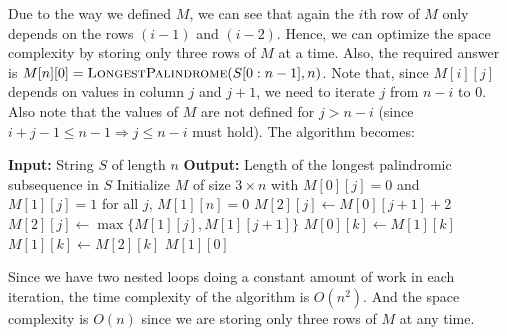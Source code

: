 \documentclass{article}
\begin{document}
  Due to the way we defined $M$, we can see that again the $i$th row of $M$ only depends on the rows $(i-1)$ and $(i-2)$.
  Hence, we can optimize the space complexity by storing only three rows of $M$ at a time.
  Also, the required answer is $M[n][0] = \textsc{LongestPalindrome}(S[0:n-1], n)$.
  Note that, since $M[i][j]$ depends on values in column $j$ and $j+1$, we need to iterate $j$ from $n-i$ to $0$.
  Also note that the values of $M$ are not defined for $j > n - i$ (since $i + j - 1 \le n - 1 \Rightarrow j \le n - i$ must hold).
  The algorithm becomes:
  \begin{algorithm}
    \caption{Longest Palindromic Subsequence}
    \begin{algorithmic}[1]
      \State \textbf{Input:} String $S$ of length $n$
      \State \textbf{Output:} Length of the longest palindromic subsequence in $S$
      \State Initialize $M$ of size $3 \times n$ with $M[0][j] = 0$ and $M[1][j] = 1$ for all $j$, $M[1][n] = 0$
            \State $M[2][j] \gets M[0][j+1] + 2$
          \Else
            \State $M[2][j] \gets \max\{M[1][j], M[1][j+1]\}$
          \EndIf
        \EndFor
        \State $M[0][k] \gets M[1][k]$
        \State $M[1][k] \gets M[2][k]$
        \EndFor
      \EndFor
      \State \Return $M[1][0]$
    \end{algorithmic}
  \end{algorithm}

  Since we have two nested loops doing a constant amount of work in each iteration, the time complexity of the algorithm is $O(n^2)$.
  And the space complexity is $O(n)$ since we are storing only three rows of $M$ at any time.
\end{document}
